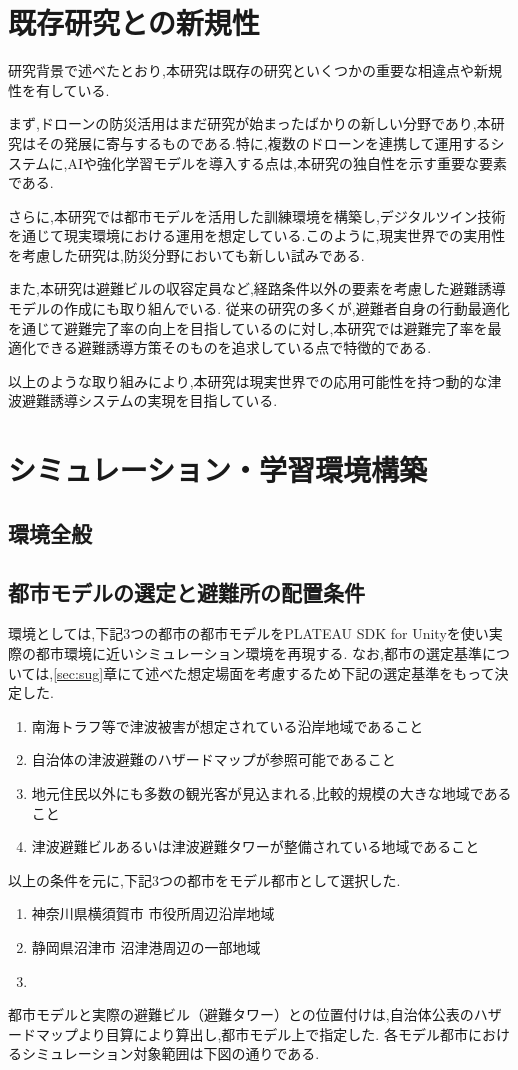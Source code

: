 \section{既存研究との新規性}  
研究背景で述べたとおり,本研究は既存の研究といくつかの重要な相違点や新規性を有している.

まず,ドローンの防災活用はまだ研究が始まったばかりの新しい分野であり,本研究はその発展に寄与するものである.特に,複数のドローンを連携して運用するシステムに,AIや強化学習モデルを導入する点は,本研究の独自性を示す重要な要素である.

さらに,本研究では都市モデルを活用した訓練環境を構築し,デジタルツイン技術を通じて現実環境における運用を想定している.このように,現実世界での実用性を考慮した研究は,防災分野においても新しい試みである.

また,本研究は避難ビルの収容定員など,経路条件以外の要素を考慮した避難誘導モデルの作成にも取り組んでいる.
従来の研究の多くが,避難者自身の行動最適化を通じて避難完了率の向上を目指しているのに対し,本研究では避難完了率を最適化できる避難誘導方策そのものを追求している点で特徴的である.

以上のような取り組みにより,本研究は現実世界での応用可能性を持つ動的な津波避難誘導システムの実現を目指している.


\section{シミュレーション・学習環境構築}
\subsection{環境全般}
\subsection{都市モデルの選定と避難所の配置条件}
環境としては,下記3つの都市の都市モデルをPLATEAU SDK for Unityを使い実際の都市環境に近いシミュレーション環境を再現する.
なお,都市の選定基準については,\ref{sec:sug}章にて述べた想定場面を考慮するため下記の選定基準をもって決定した.
\begin{enumerate}
  \item 南海トラフ等で津波被害が想定されている沿岸地域であること
  \item 自治体の津波避難のハザードマップが参照可能であること
  \item 地元住民以外にも多数の観光客が見込まれる,比較的規模の大きな地域であること
  \item 津波避難ビルあるいは津波避難タワーが整備されている地域であること
\end{enumerate}
以上の条件を元に,下記3つの都市をモデル都市として選択した.
\begin{enumerate}
  \item 神奈川県横須賀市 市役所周辺沿岸地域
  \item 静岡県沼津市 沼津港周辺の一部地域
  \item %
\end{enumerate}
都市モデルと実際の避難ビル（避難タワー）との位置付けは,自治体公表のハザードマップより目算により算出し,都市モデル上で指定した.
各モデル都市におけるシミュレーション対象範囲は下図の通りである.

